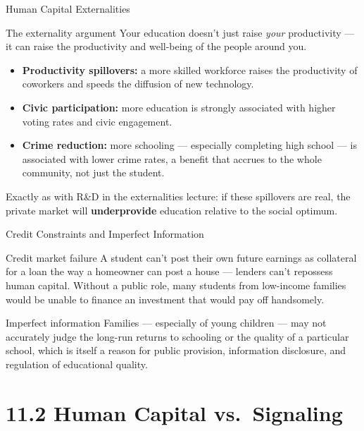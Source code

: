 \documentclass[11pt,aspectratio=169]{beamer}
\begin{document}
\begin{frame}{Human Capital Externalities}
  \begin{block}{The externality argument}
    Your education doesn't just raise \emph{your} productivity --- it can raise the productivity and well-being of the people around you.
  \end{block}
  \begin{itemize}
    \item \textbf{Productivity spillovers:} a more skilled workforce raises the productivity of coworkers and speeds the diffusion of new technology.
    \item \textbf{Civic participation:} more education is strongly associated with higher voting rates and civic engagement.
    \item \textbf{Crime reduction:} more schooling --- especially completing high school --- is associated with lower crime rates, a benefit that accrues to the whole community, not just the student.
  \end{itemize}
  \small Exactly as with R\&D in the externalities lecture: if these spillovers are real, the private market will \textbf{underprovide} education relative to the social optimum.
\end{frame}

\begin{frame}{Credit Constraints and Imperfect Information}
  \begin{block}{Credit market failure}
    A student can't post their own future earnings as collateral for a loan the way a homeowner can post a house --- lenders can't repossess human capital. Without a public role, many students from low-income families would be unable to finance an investment that would pay off handsomely.
  \end{block}
  \begin{block}{Imperfect information}
    Families --- especially of young children --- may not accurately judge the long-run returns to schooling or the quality of a particular school, which is itself a reason for public provision, information disclosure, and regulation of educational quality.
  \end{block}
\end{frame}

\section{11.2 Human Capital vs.\ Signaling}
\end{document}
